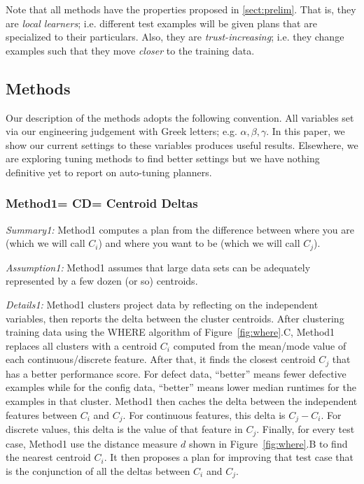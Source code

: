 \documentclass{sig-alternate}
\newcommand{\tion}[1]{\textsection\ref{sect:#1}}
\newcommand{\fig}[1]{Figure~\ref{fig:#1}}
\begin{document}
 
  Note that all   methods have the  properties proposed in \tion{prelim}.
  That is, they are {\em local learners}; i.e. different test examples
  will be given plans that are specialized  to their particulars. Also,
  they  are {\em trust-increasing}; 
  i.e. they change  examples such that they move {\em closer} to the training data.
 

 \subsection{  Methods}

Our  description of the methods adopts the following convention. All variables
  set via  our engineering judgement  with Greek letters; e.g. $\alpha,\beta,\gamma$.
  In this paper, we show our current settings to these variables produces useful
  results. Elsewhere\cite{krall14,fu:ase15}, we are exploring tuning methods to 
  find better settings but  we have nothing definitive yet to report
  on auto-tuning planners.

\subsubsection{Method1= CD=   Centroid Deltas}


 {\em Summary1:} Method1  computes a plan from the difference between where you are  (which we will call $C_i$) and
where you want to be  (which we will call $C_j$).

{\em Assumption1: } Method1 assumes that large data sets can be adequately represented by a few dozen (or so) 
centroids.
 
 {\em Details1:} Method1 clusters project data by reflecting   on the independent variables, then
  reports the delta between the cluster centroids. 
  After clustering   training data using the WHERE algorithm of  \fig{where}.C, Method1
replaces all clusters with a  centroid $C_i$ computed from the mean/mode value of each
continuous/discrete feature. After that, it
finds the closest centroid $C_j$ that has a better
performance score. For defect data, ``better'' means fewer defective examples while for the config data,
``better'' means lower median runtimes for the examples in that cluster.
Method1 then caches the  delta between the independent features between $C_i$ and $C_j$. For continuous
features, this delta is $C_j - C_i$. For discrete values, this delta is the value of that feature
in $C_j$. 
Finally, for every test case, Method1 use the distance measure $d$ shown in \fig{where}.B to find
the nearest centroid $C_i$.  It then proposes a plan for improving that test case
that is the conjunction of all the deltas between $C_i$ and $C_j$.
\end{document}
